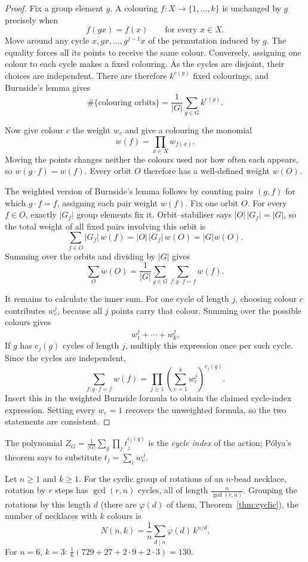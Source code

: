 \begin{proof}
Fix a group element $g$. A colouring $f:X\to\{1,\ldots,k\}$ is unchanged by $g$ precisely when
\[
f(gx)=f(x)\qquad\text{for every }x\in X.
\]
Move around any cycle $x,gx,\ldots,g^{j-1}x$ of the permutation induced by $g$. The equality forces all its points to receive the same colour. Conversely, assigning one colour to each cycle makes a fixed colouring. As the cycles are disjoint, their choices are independent. There are therefore $k^{c(g)}$ fixed colourings, and Burnside's lemma gives
\[
\#\{\text{colouring orbits}\}
=\frac1{|G|}\sum_{g\in G}k^{c(g)}.
\]

Now give colour $c$ the weight $w_c$ and give a colouring the monomial
\[
w(f)=\prod_{x\in X}w_{f(x)}.
\]
Moving the points changes neither the colours used nor how often each appears, so $w(g\cdot f)=w(f)$. Every orbit $O$ therefore has a well-defined weight $w(O)$.

The weighted version of Burnside's lemma follows by counting pairs $(g,f)$ for which $g\cdot f=f$, assigning each pair weight $w(f)$. Fix one orbit $O$. For every $f\in O$, exactly $|G_f|$ group elements fix it. Orbit--stabiliser says $|O|\,|G_f|=|G|$, so the total weight of all fixed pairs involving this orbit is
\[
\sum_{f\in O}|G_f|\,w(f)
=|O|\,|G_f|\,w(O)=|G|w(O).
\]
Summing over the orbits and dividing by $|G|$ gives
\[
\sum_O w(O)=\frac1{|G|}\sum_{g\in G}\sum_{f:g\cdot f=f}w(f).
\]

It remains to calculate the inner sum. For one cycle of length $j$, choosing colour $c$ contributes $w_c^j$, because all $j$ points carry that colour. Summing over the possible colours gives
\[
w_1^j+\cdots+w_k^j.
\]
If $g$ has $c_j(g)$ cycles of length $j$, multiply this expression once per such cycle. Since the cycles are independent,
\[
\sum_{f:g\cdot f=f}w(f)
=\prod_{j\ge1}\left(\sum_{c=1}^k w_c^j\right)^{c_j(g)}.
\]
Insert this in the weighted Burnside formula to obtain the claimed cycle-index expression. Setting every $w_c=1$ recovers the unweighted formula, so the two statements are consistent.
\end{proof}

The polynomial $Z_G=\frac1{|G|}\sum_g\prod_jt_j^{c_j(g)}$ is the \emph{cycle index} of the action; P\'olya's theorem says to substitute $t_j=\sum_cw_c^{\,j}$.

\begin{example}\label{ex:necklaceformula}
Let $n\ge1$ and $k\ge1$. For the cyclic group of rotations of an $n$-bead necklace, rotation by $r$ steps has $\gcd(r,n)$ cycles, all of length $\frac n{\gcd(r,n)}$. Grouping the rotations by this length $d$ (there are $\varphi(d)$ of them, Theorem~\ref{thm:cyclic}), the number of necklaces with $k$ colours is
\[
N(n,k)=\frac1n\sum_{d\mid n}\varphi(d)\,k^{n/d}.
\]
For $n=6$, $k=3$: $\frac16(729+27+2\cdot9+2\cdot3)=130$.
\end{example}

